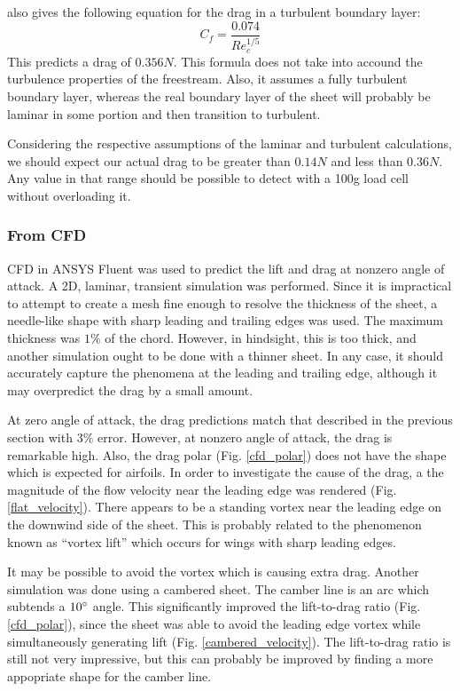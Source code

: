 \documentclass[12pt]{report} %
\begin{document}
\cite{Anderson} also gives the following equation for the drag in a turbulent boundary layer:
\[ C_f = \frac{0.074}{Re_c^{1/5}} \]
This predicts a drag of $0.356 N$. This formula does not take into accound the turbulence properties of the freestream. Also, it assumes
a fully turbulent boundary layer, whereas the real boundary layer of the sheet will probably be laminar in some portion and then
transition to turbulent.

Considering the respective assumptions of the laminar and turbulent calculations, we should expect our actual drag to be greater than
$0.14 N$ and less than $0.36 N$. Any value in that range should be possible to detect with a 100g load cell without overloading it.

\subsubsection{From CFD}
CFD in ANSYS Fluent was used to predict the lift and drag at nonzero angle of attack. A 2D, laminar, transient simulation was performed.
Since it is impractical to attempt to create a mesh fine enough to resolve the thickness of the sheet, a needle-like shape with sharp
leading and trailing edges was used. The maximum thickness was $1\%$ of the chord. However, in hindsight, this is too thick, and another
simulation ought to be done with a thinner sheet. In any case, it should accurately capture the phenomena at the leading and trailing edge,
although it may overpredict the drag by a small amount.

At zero angle of attack, the drag predictions match that described in the previous section with $3\%$ error. However,
at nonzero angle of attack,
the drag is remarkable high. Also, the drag polar (Fig. \ref{cfd_polar}) does
not have the shape which is expected for airfoils. In order to investigate
the cause of the drag, a the magnitude of the flow velocity near the leading edge was rendered (Fig. \ref{flat_velocity}). There appears
to be a
standing vortex near the leading edge on the downwind side of the sheet. This is probably related to the phenomenon known as ``vortex lift''
which occurs for wings with sharp leading edges.

It may be possible to avoid the vortex which is causing extra drag. Another simulation was done using a cambered sheet. The camber line
is an arc which subtends a $10\degree$ angle. This significantly improved the lift-to-drag ratio (Fig. \ref{cfd_polar}), since the sheet was
able to avoid the
leading edge vortex while simultaneously generating lift (Fig. \ref{cambered_velocity}). The lift-to-drag ratio is still not very impressive,
but this can probably be
improved by finding a more appopriate shape for the camber line.
\end{document}
